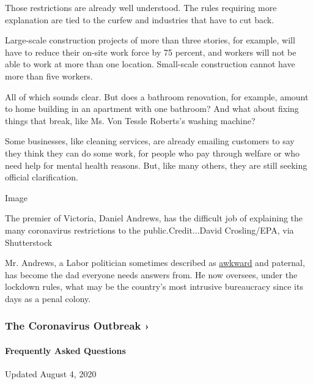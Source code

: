 Those restrictions are already well understood. The rules requiring more
explanation are tied to the curfew and industries that have to cut back.

Large-scale construction projects of more than three stories, for
example, will have to reduce their on-site work force by 75 percent, and
workers will not be able to work at more than one location. Small-scale
construction cannot have more than five workers.

All of which sounds clear. But does a bathroom renovation, for example,
amount to home building in an apartment with one bathroom? And what
about fixing things that break, like Ms. Von Tessle Roberts's washing
machine?

Some businesses, like cleaning services, are already emailing customers
to say they think they can do some work, for people who pay through
welfare or who need help for mental health reasons. But, like many
others, they are still seeking official clarification.

Image

The premier of Victoria, Daniel Andrews, has the difficult job of
explaining the many coronavirus restrictions to the
public.Credit...David Crosling/EPA, via Shutterstock

Mr. Andrews, a Labor politician sometimes described as
\href{https://www.theage.com.au/national/victoria/the-strange-feeling-i-have-when-i-watch-daniel-andrews-20200710-p55av5.html}{awkward}
and paternal, has become the dad everyone needs answers from. He now
oversees, under the lockdown rules, what may be the country's most
intrusive bureaucracy since its days as a penal colony.

\href{https://www.nytimes.com/news-event/coronavirus?action=click\&pgtype=Article\&state=default\&region=MAIN_CONTENT_3\&context=storylines_faq}{}

\hypertarget{the-coronavirus-outbreak-}{%
\subsubsection{The Coronavirus Outbreak
›}\label{the-coronavirus-outbreak-}}

\hypertarget{frequently-asked-questions}{%
\paragraph{Frequently Asked
Questions}\label{frequently-asked-questions}}

Updated August 4, 2020

